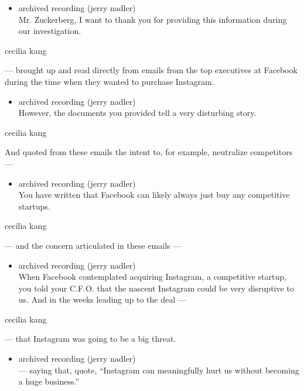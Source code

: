\begin{itemize}
\tightlist
\item
  archived recording (jerry nadler)\\
  Mr. Zuckerberg, I want to thank you for providing this information
  during our investigation.
\end{itemize}

cecilia kang

--- brought up and read directly from emails from the top executives at
Facebook during the time when they wanted to purchase Instagram.

\begin{itemize}
\tightlist
\item
  archived recording (jerry nadler)\\
  However, the documents you provided tell a very disturbing story.
\end{itemize}

cecilia kang

And quoted from these emails the intent to, for example, neutralize
competitors ---

\begin{itemize}
\tightlist
\item
  archived recording (jerry nadler)\\
  You have written that Facebook can likely always just buy any
  competitive startups.
\end{itemize}

cecilia kang

--- and the concern articulated in these emails ---

\begin{itemize}
\tightlist
\item
  archived recording (jerry nadler)\\
  When Facebook contemplated acquiring Instagram, a competitive startup,
  you told your C.F.O. that the nascent Instagram could be very
  disruptive to us. And in the weeks leading up to the deal ---
\end{itemize}

cecilia kang

--- that Instagram was going to be a big threat.

\begin{itemize}
\tightlist
\item
  archived recording (jerry nadler)\\
  --- saying that, quote, ``Instagram can meaningfully hurt us without
  becoming a huge business.''
\end{itemize}


